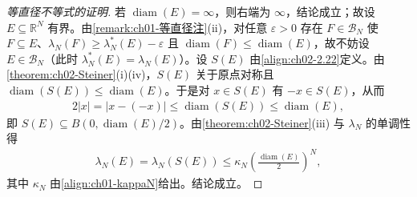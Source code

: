 \documentclass[../../main.tex]{subfiles}%
\begin{document}
\begin{proof}[等直径不等式的证明]
若 $\operatorname{diam}(E)=\infty$，则右端为 $\infty$，结论成立；故设 $E\subseteq\mathbb R^N$ 有界。由\cref{remark:ch01-等直径注}(ii)，对任意 $\varepsilon>0$ 存在 $F\in\mathscr B_N$ 使 $F\subseteq E$、$\lambda_N(F)\geqslant\lambda_N^*(E)-\varepsilon$ 且 $\operatorname{diam}(F)\leqslant\operatorname{diam}(E)$，故不妨设 $E\in\mathscr B_N$（此时 $\lambda_N^*(E)=\lambda_N(E)$）。设 $S(E)$ 由\eqref{align:ch02-2.22}定义。由\cref{theorem:ch02-Steiner}(i)(iv)，$S(E)$ 关于原点对称且 $\operatorname{diam}(S(E))\leqslant\operatorname{diam}(E)$。于是对 $x\in S(E)$ 有 $-x\in S(E)$，从而
\begin{align*}
2|x|=|x-(-x)|\leqslant\operatorname{diam}(S(E))\leqslant\operatorname{diam}(E),
\end{align*}
即 $S(E)\subseteq B(0,\operatorname{diam}(E)/2)$。由\cref{theorem:ch02-Steiner}(iii) 与 $\lambda_N$ 的单调性得
\begin{align*}
\lambda_N(E)=\lambda_N(S(E))\leqslant\kappa_N\left(\frac{\operatorname{diam}(E)}2\right)^N,
\end{align*}
其中 $\kappa_N$ 由\eqref{align:ch01-kappaN}给出。结论成立。
\end{proof}
\end{document}
